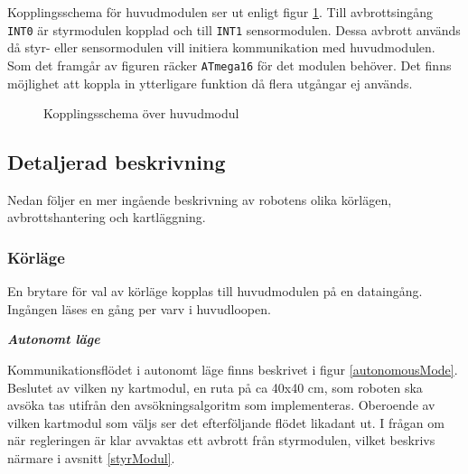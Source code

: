 \documentclass[11pt]{article}
\begin{document}
\begin{flushleft}
Kopplingsschema för huvudmodulen ser ut enligt figur \ref{kopplingsschema:huvudmodul}. Till avbrottsingång \verb+INT0+ är styrmodulen kopplad och till  \verb+INT1+ sensormodulen. Dessa avbrott används då styr- eller sensormodulen vill initiera kommunikation med huvudmodulen. Som det framgår av figuren räcker \verb+ATmega16+ för det modulen behöver. Det finns möjlighet att koppla in ytterligare funktion då flera utgångar ej används.  

\begin{figure}[htbp]
\centering
\noindent{}
	\caption{Kopplingsschema över huvudmodul \label{kopplingsschema:huvudmodul}}	
\end{figure}

\subsection{Detaljerad beskrivning}
Nedan följer en mer ingående beskrivning av robotens olika körlägen, avbrottshantering och kartläggning.
\subsubsection {Körläge}
En brytare för val av körläge kopplas till huvudmodulen på en dataingång. Ingången läses en gång per varv i huvudloopen.

\textbf{\textit{Autonomt läge}}

Kommunikationsflödet i autonomt läge finns beskrivet i figur \ref{autonomousMode}. Beslutet av vilken ny kartmodul, en ruta på ca 40x40 cm, som roboten ska avsöka tas utifrån den avsökningsalgoritm som implementeras. Oberoende av vilken kartmodul som väljs ser det efterföljande flödet likadant ut. I frågan om när regleringen är klar avvaktas ett avbrott från styrmodulen, vilket beskrivs närmare i avsnitt \ref{styrModul}.


\end{flushleft}
\end{document}

